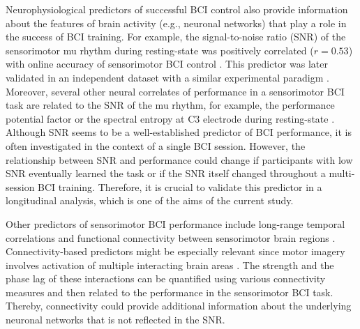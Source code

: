 \medskip

Neurophysiological predictors of successful BCI control also provide information about the features of brain activity (e.g., neuronal networks) that play a role in the success of BCI training. For example, the signal-to-noise ratio (SNR) of the sensorimotor mu rhythm during resting-state was positively correlated ($r = 0.53$) with online accuracy of sensorimotor BCI control \citep{Blankertz2010}. This predictor was later validated in an independent dataset with a similar experimental paradigm \citep{Acqualagna2016}. Moreover, several other neural correlates of performance in a sensorimotor BCI task are related to the SNR of the mu rhythm, for example, the performance potential factor \citep{Ahn2013} or the spectral entropy at C3 electrode during resting-state \citep{Zhang2015}. Although SNR seems to be a well-established predictor of BCI performance, it is often investigated in the context of a single BCI session. However, the relationship between SNR and performance could change if participants with low SNR eventually learned the task or if the SNR itself changed throughout a multi-session BCI training. Therefore, it is crucial to validate this predictor in a longitudinal analysis, which is one of the aims of the current study.

\medskip

Other predictors of sensorimotor BCI performance include long-range temporal correlations \citep{Samek2016} and functional connectivity between sensorimotor brain regions \citep{Sugata2014, Vidaurre2020}. Connectivity-based predictors might be especially relevant since motor imagery involves activation of multiple interacting brain areas \citep{Solodkin2004, Halder2011, Hardwick2018}. The strength and the phase lag of these interactions can be quantified using various connectivity measures and then related to the performance in the sensorimotor BCI task. Thereby, connectivity could provide additional information about the underlying neuronal networks that is not reflected in the SNR.

\medskip


